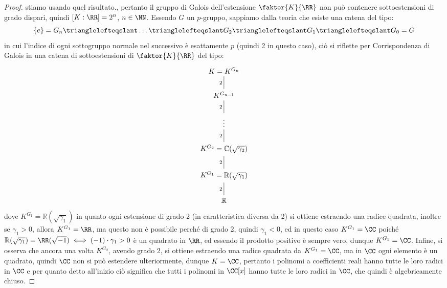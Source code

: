 \documentclass[11pt]{scrartcl}
\begin{document}
\begin{proof}
{			stiamo usando quel risultato.}, pertanto il gruppo di Galois dell'estensione $\faktor{K}{\RR}$ non può contenere sottoestensioni di grado dispari, quindi $[K : \RR] = 2^n$, $n \in \NN$. Essendo $G$ un $p$-gruppo, sappiamo dalla teoria che esiste una catena del tipo:
		\[ \{e\} = G_n \trianglelefteqslant \ldots \trianglelefteqslant G_2 \trianglelefteqslant G_1 \trianglelefteqslant G_0 = G
		\]
		in cui l'indice di ogni sottogruppo normale nel successivo è esattamente $p$ (quindi 2 in questo caso), ciò si riflette per Corrispondenza di Galois in una catena di sottoestensioni di $\faktor{K}{\RR}$ del tipo:
		\[\begin{tikzcd}
			{K = K^{G_n}} \\
			{K^{G_{n-1}}} \\
			\vdots \\
			{K^{G_2} = \mathbb{C}(\sqrt{\gamma_2})} \\
			{K^{G_1} = \mathbb{R}(\sqrt{\gamma_1})} \\
			{\mathbb{R}}
			\arrow["2"', no head, from=1-1, to=2-1]
			\arrow["2"', no head, from=2-1, to=3-1]
			\arrow["2"', no head, from=3-1, to=4-1]
			\arrow["2"', no head, from=5-1, to=6-1]
			\arrow["2"', no head, from=4-1, to=5-1]
		\end{tikzcd}\]
		dove $K^{G_1} = \mathbb{R}(\sqrt{\gamma_1})$ in quanto ogni estensione di grado 2 (in caratteristica diversa da 2) si ottiene estraendo una radice quadrata, inoltre se $\gamma_1 > 0$, allora $K^{G_1} = \RR$, ma questo non è possibile perché di grado 2, quindi $\gamma_1 < 0$, ed in questo caso $K^{G_1} = \CC$ 
		poiché $\mathbb{R}(\sqrt{\gamma_1}) = \RR(\sqrt{-1}) \iff (-1)\cdot \gamma_1 > 0 $ è un quadrato in $\RR$, ed essendo il prodotto positivo è sempre vero, dunque $K^{G_1} = \CC$. Infine, si osserva che ancora una volta $K^{G_2}$, avendo grado 2, si ottiene estraendo una radice quadrata da $K^{G_1} = \CC$, ma in $\CC$ ogni 
		elemento è un quadrato, quindi $\CC$ non si può estendere ulteriormente, dunque $K = \CC$, pertanto i polinomi a coefficienti reali hanno tutte le loro radici in $\CC$ e per quanto detto all'inizio ciò significa che tutti i polinomi in $\CC[x]$ hanno tutte le loro radici in $\CC$, che quindi è algebricamente chiuso.
	\end{proof}
	
\end{document}

